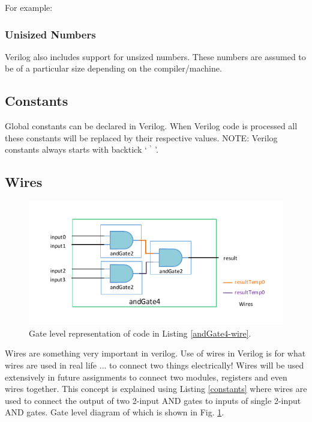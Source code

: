 \documentclass[a4paper,10pt]{article}
\theoremstyle{mytheor}
\newcommand{
  \insertverilog}[3]{
  
}
\begin{document}
For example:
\insertverilog{./verilog_files/sizedNumbers.v}{sized-numbers}{\text{Example of sized numbers}}
 
\subsubsection*{Unisized Numbers}
Verilog also includes support for unsized numbers. These numbers are
assumed to be of a particular size depending on the
compiler/machine.

\subsection*{Constants}
Global constants can be declared in Verilog. When Verilog code is processed all these constants will be replaced by their respective values. NOTE: Verilog constants always starts with backtick ` ${}^{\backprime}$ '. 
\insertverilog{./verilog_files/constants.v}{constants}{\text{Declaration and use of constants}}

\subsection*{Wires}

\begin{figure}[!h] \centering  
  \includegraphics[width=\linewidth]{./resources/andGate4_representation.pdf}
  \caption{Gate level representation of code in Listing \ref{andGate4-wire}.} 
  \label{Fig:andGate4-representation}
\end{figure}

Wires are something very important in verilog. Use of wires in Verilog is for what wires are used in real life ... to connect two things electrically! Wires will be used extensively in future assignments to connect two modules, registers and even wires together. This concept is explained using Listing \ref{constants} where wires are used to connect the output of two 2-input AND gates to inputs of single 2-input AND gates. Gate level diagram of which is shown in Fig. \ref{Fig:andGate4-representation}.
\end{document}
